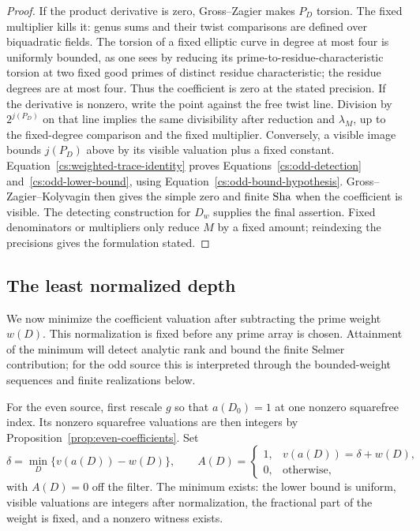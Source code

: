 \begin{proof}
If the product derivative is zero, Gross--Zagier makes $P_D$ torsion.
The fixed multiplier kills it: genus sums and their twist comparisons
are defined over biquadratic fields.  The torsion of a fixed elliptic
curve in degree at most four is uniformly bounded, as one sees by
reducing its prime-to-residue-characteristic torsion at two fixed good
primes of distinct residue characteristic; the residue degrees are at
most four.  Thus the coefficient is zero at
the stated precision.  If the derivative is nonzero, write the point
against the free twist line.  Division by $2^{j(P_D)}$ on that line
implies the same divisibility after reduction and $\lambda_M$, up to
the fixed-degree comparison and the fixed multiplier.  Conversely,
a visible image bounds $j(P_D)$ above by its visible valuation plus a
fixed constant.  Equation~\eqref{cs:weighted-trace-identity} proves
Equations~\eqref{cs:odd-detection} and~\eqref{cs:odd-lower-bound}, using
Equation~\eqref{cs:odd-bound-hypothesis}.  Gross--Zagier--Kolyvagin
then gives the simple zero and finite $\operatorname{Sha}$ when the coefficient is
visible.  The detecting construction for $D_w$ supplies the final
assertion.  Fixed denominators or multipliers only reduce $M$ by a
fixed amount; reindexing the precisions gives the formulation stated.
\end{proof}

\subsection{The least normalized depth}

We now minimize the coefficient valuation after subtracting the prime
weight $w(D)$. This normalization is fixed before any prime array is
chosen. Attainment of the minimum will detect analytic rank and bound
the finite Selmer contribution; for the odd source this is interpreted
through the bounded-weight sequences and finite realizations below.

For the even source, first rescale $g$ so that $a(D_0)=1$ at one
nonzero squarefree index. Its nonzero squarefree valuations are then
integers by Proposition~\ref{prop:even-coefficients}. Set
\begin{equation}
              \delta=\min_D\{v(a(D))-w(D)\},\qquad
 A(D)=\begin{cases}
 1,&v(a(D))=\delta+w(D),\\
 0,&\text{otherwise},
 \end{cases}
\label{cs:even-symbol}
\end{equation}
with $A(D)=0$ off the filter.  The minimum exists: the lower bound is
uniform, visible valuations are integers after normalization, the
fractional part of the weight is fixed, and a nonzero witness exists.


